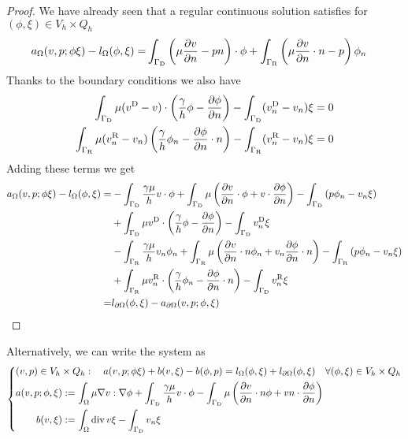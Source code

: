 \begin{proof}
We have already seen that a regular continuous solution satisfies for $(\phi,\xi)\in V_h\times Q_h$
%
%
\begin{align*}
a_{\Omega}(v,p; \phi\xi)  - l_{\Omega}(\phi,\xi) =& 
\int_{\Gamma_{\rm D}} \left( \mu\frac{\partial v}{\partial n} - pn\right)\cdot\phi
+ \int_{\Gamma_{\rm R}} \left( \mu\frac{\partial v}{\partial n}\cdot n-p\right)\phi_n
\end{align*}
%
Thanks to the boundary conditions we also have
%
\begin{align*}
\int_{\Gamma_{\rm D}}\mu(v^{\rm D}-v)\cdot\left( \frac{\gamma}{h}\phi - \frac{\partial \phi}{\partial n}\right)- \int_{\Gamma_{\rm D}}(v^{\rm D}_n-v_n)\xi =0\\
\int_{\Gamma_{\rm R}} \mu(v^{\rm R}_n-v_n)\left( \frac{\gamma}{h}\phi_n - \frac{\partial \phi}{\partial n}\cdot n\right) - \int_{\Gamma_{\rm R}}(v^{\rm R}_n-v_n)\xi = 0
\end{align*}
%
Adding these terms we get
%
\begin{align*}
a_{\Omega}(v,p; \phi\xi)  - l_{\Omega}(\phi,\xi) =&
-\int_{\Gamma_{\rm D}}\frac{\gamma\mu}{h}v\cdot\phi
+ \int_{\Gamma_{\rm D}} \mu\left( \frac{\partial v}{\partial n}\cdot\phi + v\cdot\frac{\partial \phi}{\partial n} \right)
- \int_{\Gamma_{\rm D}} \left( p\phi_n - v_n\xi\right)\\
&+ \int_{\Gamma_{\rm D}}\mu v^{\rm D}\cdot\left( \frac{\gamma}{h}\phi - \frac{\partial \phi}{\partial n}\right)- \int_{\Gamma_{\rm D}}v^{\rm D}_n\xi\\
&-\int_{\Gamma_{\rm R}}\frac{\gamma\mu}{h}v_n\phi_n
+ \int_{\Gamma_{\rm R}} \mu\left( \frac{\partial v}{\partial n}\cdot n \phi_n + v_n\frac{\partial \phi}{\partial n}\cdot n \right)
- \int_{\Gamma_{\rm R}} \left( p\phi_n - v_n\xi\right)\\
&+ \int_{\Gamma_{\rm R}}\mu v^{\rm R}_n\cdot\left( \frac{\gamma}{h}\phi_n - \frac{\partial \phi}{\partial n}\cdot n\right)- \int_{\Gamma_{\rm D}}v^{\rm R}_n\xi\\
=& l_{\partial\Omega}(\phi,\xi) - a_{\partial\Omega}(v,p; \phi,\xi)
\end{align*}
%

%
\end{proof}
%



Alternatively, we can write the system as
%
\begin{equation}\label{eq:stokes:nitsche2}
%
\left\{
\begin{aligned}
&(v,p)\in V_h\times Q_h:\quad a(v,p; \phi\xi) + b(v, \xi)- b(\phi, p) = l_{\Omega}(\phi,\xi)+l_{\partial\Omega}(\phi,\xi) \quad\forall (\phi,\xi)\in V_h\times Q_h\\
&\begin{aligned}
a(v,p; \phi,\xi) &:= \int_{\Omega} \mu \nabla v:\nabla\phi +\int_{\GammaD}\frac{\gamma\mu}{h}v\cdot\phi - 
 \int_{\GammaD}\mu \left(  \dn{v}\cdot n \phi + v n \cdot \dn{\phi}\right)\\
b(v, \xi) &:=  \int_{\Omega} \div v \xi - \int_{\GammaD} v_n \xi
\end{aligned}
\end{aligned}
\right.
%
\end{equation}
%
%
